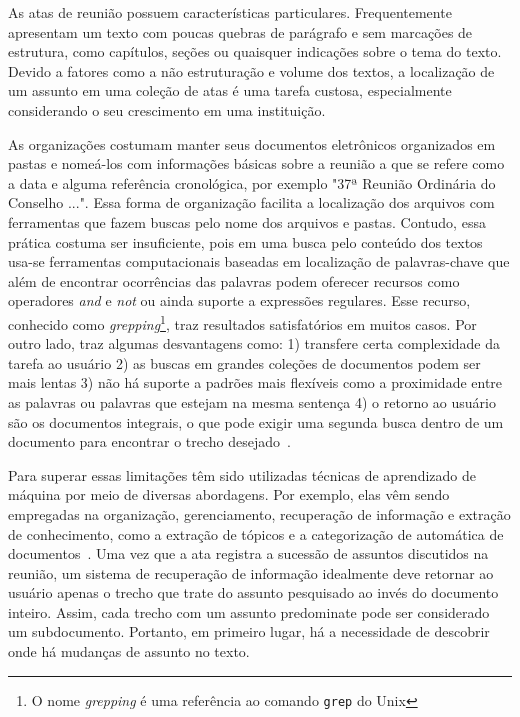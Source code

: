 As atas de reunião possuem características particulares. Frequentemente apresentam um texto com poucas quebras de parágrafo e sem marcações de estrutura, como capítulos, seções ou quaisquer indicações sobre o tema do texto. Devido a fatores como a não estruturação e volume dos textos, a localização de um assunto em uma coleção de atas é uma tarefa custosa, especialmente considerando o seu crescimento em uma instituição. 


As organizações costumam manter seus documentos eletrônicos organizados em pastas e nomeá-los com informações básicas sobre a reunião a que se refere como a data e alguma referência cronológica, por exemplo "37ª Reunião Ordinária do Conselho ...". Essa forma de organização facilita a localização dos arquivos com ferramentas que fazem buscas pelo nome dos arquivos e pastas. Contudo, essa prática costuma ser insuficiente, pois em uma busca pelo conteúdo dos textos usa-se ferramentas computacionais baseadas em localização de palavras-chave que além de encontrar ocorrências das palavras podem oferecer recursos como operadores \textit{and} e \textit{not} ou ainda suporte a expressões regulares. Esse recurso, conhecido como \textit{grepping}\footnote{O nome \textit{grepping} é uma referência ao comando \texttt{grep} do Unix}, traz resultados satisfatórios em muitos casos. Por outro lado, traz algumas desvantagens como: 1) transfere certa complexidade da tarefa ao usuário 2) as buscas em grandes coleções de documentos podem ser mais lentas 3) não há suporte a padrões mais flexíveis como a proximidade entre as palavras ou palavras que estejam na mesma sentença 4) o retorno ao usuário são os documentos integrais, o que pode exigir uma segunda busca dentro de um documento para encontrar o trecho desejado~\cite{Aggarwal2012,Manning2008}. 


Para superar essas limitações têm sido utilizadas técnicas de aprendizado de máquina por meio de diversas abordagens. Por exemplo, elas vêm sendo empregadas na organização, gerenciamento, recuperação de informação e extração de conhecimento, como a extração de tópicos e a categorização de automática de documentos~\cite{Purver2006}. 
% 
% 
% 
Uma vez que a ata registra a sucessão de assuntos discutidos na reunião, um sistema de recuperação de informação idealmente deve retornar ao usuário apenas o trecho que trate do assunto pesquisado ao invés do documento inteiro. Assim, cada trecho com um assunto predominate pode ser considerado um subdocumento. Portanto, em primeiro lugar, há a necessidade de descobrir onde há mudanças de assunto no texto. 



